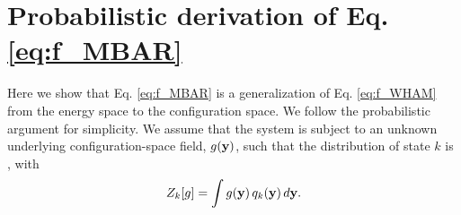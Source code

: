 \documentclass[aip,jcp,preprint,superscriptaddress]{revtex4-1}
\begin{document}
\appendix





\section{\label{sec:deriveMBAR}
Probabilistic derivation of Eq. \eqref{eq:f_MBAR}}



Here we show that
Eq. \eqref{eq:f_MBAR}
is a generalization of Eq. \eqref{eq:f_WHAM}
from the energy space to the configuration space.
%
We follow the probabilistic argument\cite{
bartels1997, *gallicchio2005, *habeck2007, *habeck2012, zhu2012}
for simplicity.
%
We assume that the system is subject to
an unknown underlying configuration-space field, $g(\mathbf{y})$,
such that the distribution of state $k$ is
, with
%
\begin{equation}
Z_k[g]
=
\int g(\mathbf{y}) \, q_k(\mathbf{y}) \, d\mathbf{y}.
\label{eq:Zg}
\end{equation}
\end{document}
